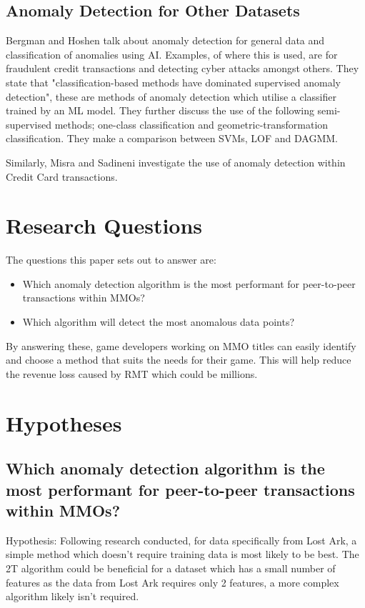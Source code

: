 \documentclass[journal]{IEEEtran}
\begin{document}
\subsection{Anomaly Detection for Other Datasets}
\noindent Bergman and Hoshen talk about anomaly detection for general data and classification of anomalies using AI. Examples, of where this is used, are for fraudulent credit transactions and detecting cyber attacks amongst others\cite{Bergman2020}. They state that "classification-based methods have dominated supervised anomaly detection", these are methods of anomaly detection which utilise a classifier trained by an ML model. They further discuss the use of the following semi-supervised methods; one-class classification and geometric-transformation classification. They make a comparison between SVMs\cite{Schoelkopf1999}, LOF\cite{Breunig2000} and DAGMM\cite{Zong2018}.

Similarly, Misra and Sadineni investigate the use of anomaly detection within Credit Card transactions\cite{Misra2020}\cite{Sadineni2020}.

\section{Research Questions}
\noindent The questions this paper sets out to answer are:
\begin{itemize}
    \item Which anomaly detection algorithm is the most performant for peer-to-peer transactions within MMOs?
    \item Which algorithm will detect the most anomalous data points?
\end{itemize}

By answering these, game developers working on MMO titles can easily identify and choose a method that suits the needs for their game. This will help reduce the revenue loss caused by RMT which could be millions\cite{Dibbell2007}.

\section{Hypotheses}
\subsection{Which anomaly detection algorithm is the most performant for peer-to-peer transactions within MMOs?}
\noindent
Hypothesis: Following research conducted, for data specifically from Lost Ark, a simple method which doesn't require training data is most likely to be best. The 2T algorithm\cite{Yang2019} could be beneficial for a dataset which has a small number of features as the data from Lost Ark requires only 2 features, a more complex algorithm likely isn't required.
\end{document}
